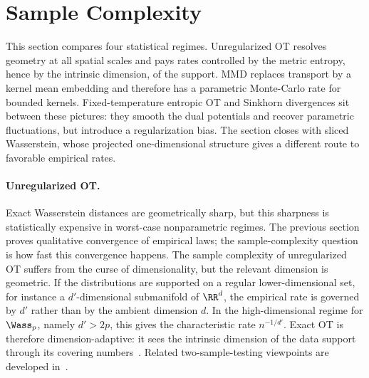 \section{Sample Complexity}
\label{sec-sample-complexity}

This section compares four statistical regimes. Unregularized OT resolves geometry at all spatial scales and pays rates controlled by the metric entropy, hence by the intrinsic dimension, of the support. MMD replaces transport by a kernel mean embedding and therefore has a parametric Monte-Carlo rate for bounded kernels. Fixed-temperature entropic OT and Sinkhorn divergences sit between these pictures: they smooth the dual potentials and recover parametric fluctuations, but introduce a regularization bias. The section closes with sliced Wasserstein, whose projected one-dimensional structure gives a different route to favorable empirical rates.

\paragraph{Unregularized OT.}
Exact Wasserstein distances are geometrically sharp, but this sharpness is statistically expensive in worst-case nonparametric regimes. The previous section proves qualitative convergence of empirical laws; the sample-complexity question is how fast this convergence happens. The sample complexity of unregularized OT suffers from the curse of dimensionality, but the relevant dimension is geometric. If the distributions are supported on a regular lower-dimensional set, for instance a $d'$-dimensional submanifold of $\RR^d$, the empirical rate is governed by $d'$ rather than by the ambient dimension $d$. In the high-dimensional regime for $\Wass_p$, namely $d'>2p$, this gives the characteristic rate $n^{-1/d'}$. Exact OT is therefore dimension-adaptive: it sees the intrinsic dimension of the data support through its covering numbers~\cite{dudley1969speed,weed2017sharp}. Related two-sample-testing viewpoints are developed in~\cite{ramdas2017wasserstein}.

